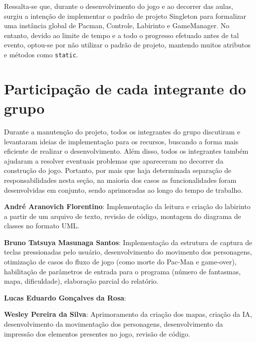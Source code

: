 \documentclass[]{article}
\begin{document}
Ressalta-se que, durante o desenvolvimento do jogo e ao decorrer das aulas, surgiu a intenção de implementar o padrão de projeto Singleton para formalizar uma instância global de Pacman, Controle, Labirinto e GameManager. No entanto, devido ao limite de tempo e a todo o progresso efetuado antes de tal evento, optou-se por não utilizar o padrão de projeto, mantendo muitos atributos e métodos como \texttt{static}.

\section{Participação de cada integrante do grupo}
Durante a manutenção do projeto, todos os integrantes do grupo discutiram e levantaram ideias de implementação para os recursos, buscando a forma mais eficiente de realizar o desenvolvimento. Além disso, todos os integrantes também ajudaram a resolver eventuais problemas que apareceram no decorrer da construção do jogo. Portanto, por mais que haja determinada separação de responsabilidades nesta seção, na maioria dos casos as funcionalidades foram desenvolvidas em conjunto, sendo aprimoradas ao longo do tempo de trabalho.

\textbf{André Aranovich Florentino}: Implementação da leitura e criação do labirinto a partir de um arquivo de texto, revisão de código, montagem do diagrama de classes no formato UML.

\textbf{Bruno Tatsuya Masunaga Santos}: Implementação da estrutura de captura de teclas pressionadas pelo usuário, desenvolvimento do movimento dos personagens, otimização de casos do fluxo de jogo (como morte do Pac-Man e game-over), habilitação de parâmetros de entrada para o programa (número de fantasmas, mapa, dificuldade), elaboração parcial do relatório.

\textbf{Lucas Eduardo Gonçalves da Rosa}:

\textbf{Wesley Pereira da Silva}: Aprimoramento da criação dos mapas, criação da IA, desenvolvimento da movimentação dos personagens, desenvolvimento da impressão dos elementos presentes no jogo, revisão de código.
\end{document}
